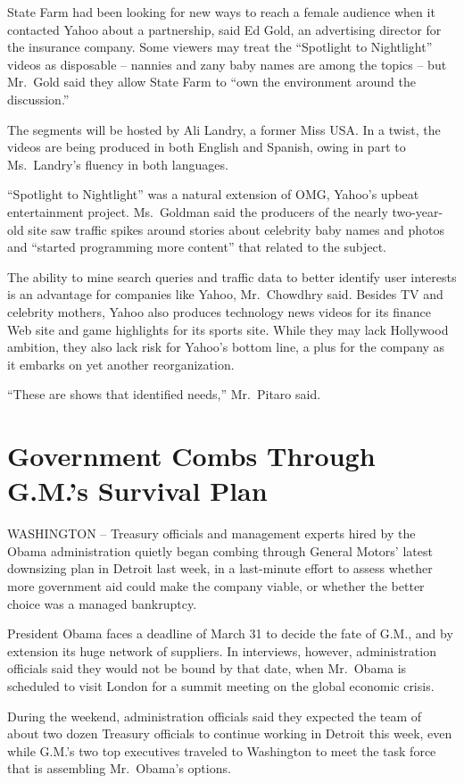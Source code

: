 \documentclass[12pt,a4paper,onecolumn]{article}
\begin{document}
\begin{CJK*}{GBK}{song}
State Farm had been looking for new ways to reach a female audience when it contacted Yahoo about a
partnership, said Ed Gold, an advertising director for the insurance company. Some viewers may treat
the ``Spotlight to Nightlight'' videos as disposable -- nannies and zany baby names are among the
topics -- but Mr.~Gold said they allow State Farm to ``own the environment around the discussion.''

The segments will be hosted by Ali Landry, a former Miss USA. In a twist, the videos are being
produced in both English and Spanish, owing in part to Ms.~Landry's fluency in both languages.

``Spotlight to Nightlight'' was a natural extension of OMG, Yahoo's upbeat entertainment project.
Ms.~Goldman said the producers of the nearly two-year-old site saw traffic spikes around stories
about celebrity baby names and photos and ``started programming more content'' that related to the
subject.

The ability to mine search queries and traffic data to better identify user interests is an
advantage for companies like Yahoo, Mr.~Chowdhry said. Besides TV and celebrity mothers, Yahoo also
produces technology news videos for its finance Web site and game highlights for its sports site.
While they may lack Hollywood ambition, they also lack risk for Yahoo's bottom line, a plus for the
company as it embarks on yet another reorganization.

``These are shows that identified needs,'' Mr.~Pitaro said.

\section{Government Combs Through G.M.'s Survival Plan}

WASHINGTON -- Treasury officials and management experts hired by the Obama administration quietly
began combing through General Motors' latest downsizing plan in Detroit last week, in a last-minute
effort to assess whether more government aid could make the company viable, or whether the better
choice was a managed bankruptcy.

President Obama faces a deadline of March 31 to decide the fate of G.M., and by extension its huge
network of suppliers. In interviews, however, administration officials said they would not be bound
by that date, when Mr.~Obama is scheduled to visit London for a summit meeting on the global
economic crisis.

During the weekend, administration officials said they expected the team of about two dozen Treasury
officials to continue working in Detroit this week, even while G.M.'s two top executives traveled to
Washington to meet the task force that is assembling Mr.~Obama's options.


\end{CJK*}
\end{document}
